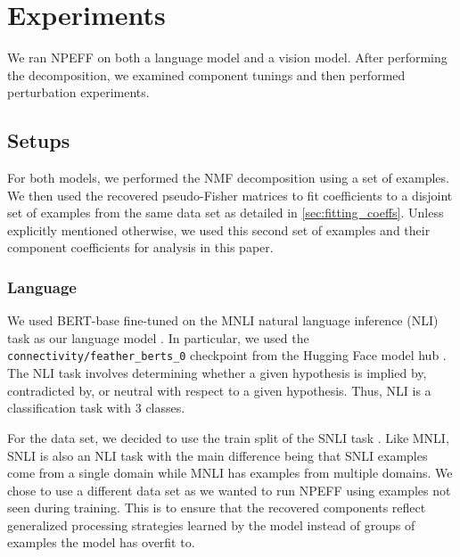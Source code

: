 \documentclass[dvipsnames]{article}
\begin{document}


\section{Experiments}
We ran NPEFF on both a language model and a vision model.
After performing the decomposition, we examined component tunings and then performed perturbation experiments.

\subsection{Setups}
For both models, we performed the NMF decomposition using a set of examples. We then used the recovered pseudo-Fisher matrices to fit coefficients to a disjoint set of examples from the same data set as detailed in \cref{sec:fitting_coeffs}. Unless explicitly mentioned otherwise, we used this second set of examples and their component coefficients for analysis in this paper.

\subsubsection{Language}
We used BERT-base fine-tuned on the MNLI natural language inference (NLI) task as our language model \citep{devlin2018bert, mnli}.
In particular, we used the \texttt{connectivity/feather\_berts\_0} checkpoint from the Hugging Face model hub \citep{mccoy2019berts, wolf2019huggingface}.
The NLI task involves determining whether a given hypothesis is implied by, contradicted by, or neutral with respect to a given hypothesis.
Thus, NLI is a classification task with 3 classes.

For the data set, we decided to use the train split of the SNLI task \citep{bowman2015large}.
Like MNLI, SNLI is also an NLI task with the main difference being that SNLI examples come from a single domain while MNLI has examples from multiple domains.
We chose to use a different data set as we wanted to run NPEFF using examples not seen during training. %
This is to ensure that the recovered components reflect generalized processing strategies learned by the model instead of groups of examples the model has overfit to.
\end{document}
